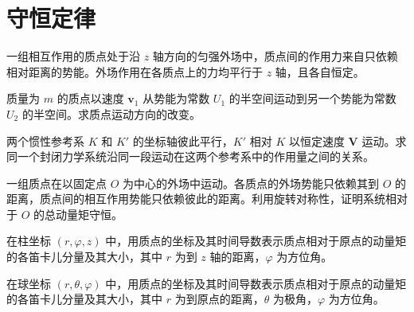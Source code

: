 \renewcommand{\thesection}{\arabic{section}}\renewcommand{\theHsection}{chapter.\arabic{section}}\setcounter{section}{1}\section{守恒定律}
\noindent\begin{minipage}{\textwidth}
一组相互作用的质点处于沿 $z$ 轴方向的匀强外场中，质点间的作用力来自只依赖相对距离的势能。外场作用在各质点上的力均平行于 $z$ 轴，且各自恒定。
\end{minipage}\par\vfill
\noindent\begin{minipage}{\textwidth}
质量为 $m$ 的质点以速度 $\mathbf{v}_1$ 从势能为常数 $U_1$ 的半空间运动到另一个势能为常数 $U_2$ 的半空间。求质点运动方向的改变。
\end{minipage}\par\vfill
\newpage
\noindent\begin{minipage}{\textwidth}
两个惯性参考系 $K$ 和 $K\prime$ 的坐标轴彼此平行，$K\prime$ 相对 $K$ 以恒定速度 $\mathbf V$ 运动。求同一个封闭力学系统沿同一段运动在这两个参考系中的作用量之间的关系。
\end{minipage}\par\vfill
\noindent\begin{minipage}{\textwidth}
一组质点在以固定点 $O$ 为中心的外场中运动。各质点的外场势能只依赖其到 $O$ 的距离，质点间的相互作用势能只依赖彼此的距离。利用旋转对称性，证明系统相对于 $O$ 的总动量矩守恒。
\end{minipage}\par\vfill
\newpage
\noindent\begin{minipage}{\textwidth}
在柱坐标 $(r,\varphi,z)$ 中，用质点的坐标及其时间导数表示质点相对于原点的动量矩的各笛卡儿分量及其大小，其中 $r$ 为到 $z$ 轴的距离，$\varphi$ 为方位角。
\end{minipage}\par\vfill
\noindent\begin{minipage}{\textwidth}
在球坐标 $(r,\theta,\varphi)$ 中，用质点的坐标及其时间导数表示质点相对于原点的动量矩的各笛卡儿分量及其大小，其中 $r$ 为到原点的距离，$\theta$ 为极角，$\varphi$ 为方位角。
\end{minipage}\par\vfill
